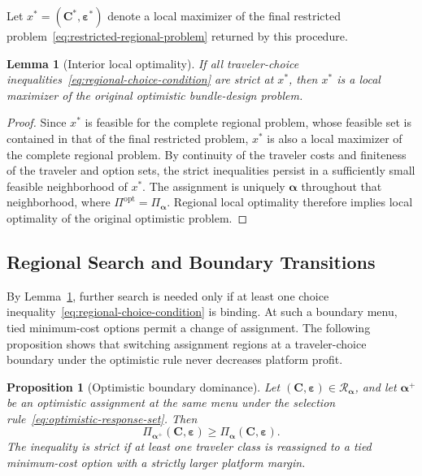 \documentclass{article}
\newtheorem{proposition}{Proposition}
\newtheorem{lemma}{Lemma}
\begin{document}
Let $x^*=(\bm C^*,\bm\varepsilon^*)$ denote a local maximizer of the
final restricted problem~\eqref{eq:restricted-regional-problem} returned
by this procedure.

\begin{lemma}[Interior local optimality]
If all
traveler-choice inequalities~\eqref{eq:regional-choice-condition} are
strict at $x^*$, then $x^*$ is a local maximizer of the original
optimistic bundle-design problem.
\label{lem:interior-regional-optimality}
\end{lemma}

\begin{proof}
Since $x^*$ is feasible for the complete regional problem, whose feasible
set is contained in that of the final restricted problem, $x^*$ is also
a local maximizer of the complete regional problem. By continuity of the
traveler costs and finiteness of
the traveler and option sets, the strict inequalities persist in a
sufficiently small feasible neighborhood of $x^*$. The assignment is
uniquely $\bm\alpha$ throughout that neighborhood, where
$\Pi^{\mathrm{opt}}=\Pi_{\bm\alpha}$. Regional local optimality therefore
implies local optimality of the original optimistic problem.
\end{proof}

\subsection{Regional Search and Boundary Transitions}
\label{sec:regional-search-procedure}

By Lemma~\ref{lem:interior-regional-optimality},
further search is needed only if at least one choice
inequality~\eqref{eq:regional-choice-condition} is binding. At such a
boundary menu, tied minimum-cost options permit a change of assignment.
The following proposition shows that switching assignment regions at a
traveler-choice boundary under the optimistic rule never decreases
platform profit.

\begin{proposition}[Optimistic boundary dominance]
Let $(\bm C,\bm\varepsilon)\in\mathcal R_{\bm\alpha}$, and let
$\bm\alpha^+$ be an optimistic assignment at the same menu under
the selection rule~\eqref{eq:optimistic-response-set}. Then
\begin{equation}
    \Pi_{\bm\alpha^+}(\bm C,\bm\varepsilon)
    \geq
    \Pi_{\bm\alpha}(\bm C,\bm\varepsilon).
    \label{eq:optimistic-boundary-dominance}
\end{equation}
The inequality is strict if at least one traveler class is reassigned
to a tied minimum-cost option with a strictly larger platform margin.
\label{prop:optimistic-boundary-dominance}
\end{proposition}
\end{document}
